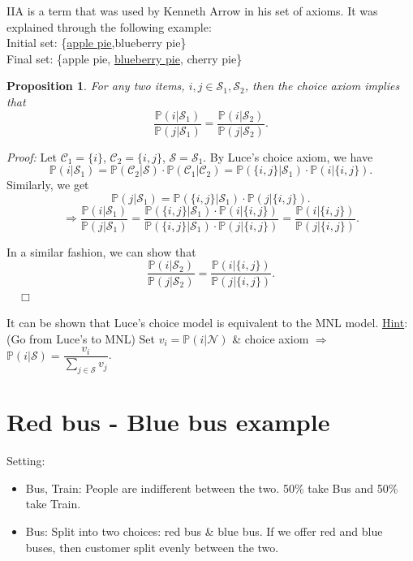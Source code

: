 \documentclass[11pt]{article}
\newtheorem{proposition}{Proposition}
\newenvironment{proof}{\noindent\emph{Proof:}}{$\quad \Box$}
\begin{document}
IIA is a term that was used by Kenneth Arrow in his set of axioms. It was explained through the following example:\\
\indent Initial set: \{\underline{apple pie},blueberry pie\}\\
\indent Final set: \{apple pie, \underline{blueberry pie}, cherry pie\}
\begin{proposition}
	For any two items, $i,j\in \mathcal{S}_1,\mathcal{S}_2$, then the choice axiom implies that
	\begin{equation}
	\dfrac{\mathbb{P}(i|\mathcal{S}_1)}{\mathbb{P}(j|\mathcal{S}_1)}=\dfrac{\mathbb{P}(i|\mathcal{S}_2)}{\mathbb{P}(j|\mathcal{S}_2)}.
	\end{equation}
\end{proposition}
\begin{proof}
	Let $\mathcal{C}_1 = \{i\}$, $\mathcal{C}_2=\{i,j\}$, $\mathcal{S}=\mathcal{S}_1$. By Luce's choice axiom, we have
	\begin{equation}
	\mathbb{P}(i|\mathcal{S}_1)=\mathbb{P}(\mathcal{C}_2|\mathcal{S})\cdot \mathbb{P}(\mathcal{C}_1|\mathcal{C}_2)=\mathbb{P}(\{i,j\}|\mathcal{S}_1)\cdot \mathbb{P}(i|\{i,j\}).
	\end{equation}
	Similarly, we get
	\begin{equation}
	\mathbb{P}(j|\mathcal{S}_1)=\mathbb{P}(\{i,j\}|\mathcal{S}_1)\cdot \mathbb{P}(j|\{i,j\}).
	\end{equation}
	\begin{equation}
	\Rightarrow \dfrac{\mathbb{P}(i|\mathcal{S}_1)}{\mathbb{P}(j|\mathcal{S}_1)}=\dfrac{\mathbb{P}(\{i,j\}|\mathcal{S}_1)\cdot \mathbb{P}(i|\{i,j\})}{\mathbb{P}(\{i,j\}|\mathcal{S}_1)\cdot \mathbb{P}(j|\{i,j\})} = \dfrac{\mathbb{P}(i|\{i,j\})}{\mathbb{P}(j|\{i,j\})}.
	\end{equation}
	
	In a similar fashion, we can show that 
	\begin{equation}
	\dfrac{\mathbb{P}(i|\mathcal{S}_2)}{\mathbb{P}(j|\mathcal{S}_2)}=\dfrac{\mathbb{P}(i|\{i,j\})}{\mathbb{P}(j|\{i,j\})}.
	\end{equation}
\end{proof}

It can be shown that Luce's choice model is equivalent to the MNL model. \underline{Hint}: (Go from Luce's to MNL) Set $v_i = \mathbb{P}(i|\mathcal{N})$ \& choice axiom $\Rightarrow$ $\mathbb{P}(i|\mathcal{S})=\dfrac{v_i}{\sum\limits_{j\in \mathcal{S}}v_j}$.

\section{Red bus - Blue bus example}
Setting:
\begin{itemize}
	\item Bus, Train: People are indifferent between the two. 50\% take Bus and 50\% take Train.
	\item Bus: Split into two choices: red bus \& blue bus.	If we offer red and blue buses, then customer split evenly between the two.
\end{itemize}
\end{document}
